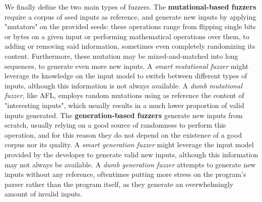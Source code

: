 \documentclass[Lau,oneside]{sapthesis}%
\begin{document}
\newpage
We finally define the two main types of fuzzers.
\newline \newline
The \textbf{mutational-based fuzzers} require a corpus of seed inputs as reference, and generate new inputs by applying "mutators" on the provided seeds: these operations range from flipping single bits or bytes on a given input or performing mathematical operations over them, to adding or removing said information, sometimes even completely randomizing its content. Furthermore, these mutation may be mixed-and-matched into long sequences, to generate even more new inputs.
\newline
A \textit{smart mutational fuzzer} might leverage its knowledge on the input model to switch between different types of inputs, although this information is not always available.
\newline
A \textit{dumb mutational fuzzer}, like AFL, employs random mutations using as reference the content of "interesting inputs", which usually results in a much lower proportion of valid inputs generated.
\newline \newline
The \textbf{generation-based fuzzers} generate new inputs from scratch, usually relying on a good source of randomness to perform this operation, and for this reason they do not depend on the existence of a good corpus nor its quality.
\newline
A \textit{smart generation fuzzer} might leverage the input model provided by the developer to generate valid new inputs, although this information may not always be available.
\newline
A \textit{dumb generation fuzzer} attempts to generate new inputs without any reference, oftentimes putting more stress on the program's parser rather than the program itself, as they generate an overwhelmingly amount of invalid inputs.







\newpage
\end{document}
